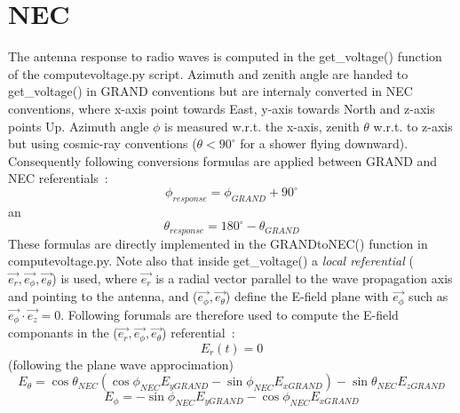 \documentclass[12pt]{article}
\newcommand*{\courierfont}{\fontfamily{pcr}\selectfont}
\begin{document}
\section{NEC}\label{sec:nec}
The antenna response to radio waves is computed in the {\courierfont get\_voltage()} function of the {\courierfont computevoltage.py} script. Azimuth and zenith angle are handed to {\courierfont get\_voltage()} in GRAND conventions but are internaly converted in NEC conventions, where x-axis point towards East, y-axis towards North and z-axis points Up. Azimuth angle $\phi$ is measured w.r.t. the x-axis, zenith $\theta$ w.r.t. to z-axis but using cosmic-ray conventions ($\theta<90^{\circ}$ for a shower flying downward). Consequently following conversions formulas are applied between GRAND and NEC referentials~:
\[\phi_{response}=\phi_{GRAND}+90^\circ\] an
\[\theta_{response}= 180^\circ-\theta_{GRAND}\] 
These formulas are directly implemented in the {\courierfont GRANDtoNEC()} function in {\courierfont computevoltage.py}.
Note also that inside {\courierfont get\_voltage()} a {\it local referential} ($\vec{e_r},\vec{e_\phi},\vec{e_\theta}$) is used, where $\vec{e_r}$ is a radial vector parallel to the wave propagation axis and pointing to the antenna, and ($\vec{e_\phi},\vec{e_\theta}$) define the E-field plane with $\vec{e_\phi}$ such as $\vec{e_\phi}\cdot\vec{e_z}=0$.
Following forumals are therefore used to compute the E-field componants in the ($\vec{e_r},\vec{e_\phi},\vec{e_\theta}$) referential~: \\
\[E_r(t)=0 \] (following the plane wave approcimation)
\[E_\theta = \cos\theta_{NEC}(\cos\phi_{NEC} E_{yGRAND} - \sin\phi_{NEC}E_{xGRAND})-\sin\theta_{NEC}E_{zGRAND} \] 
\[E_\phi = -\sin\phi_{NEC}E_{yGRAND}-\cos\phi_{NEC}E_{xGRAND} \]
\end{document}
